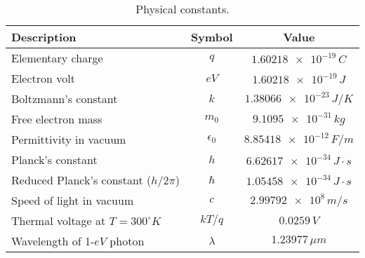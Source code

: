     \begin{table}[H]
    \centering
    \setlength{\tabcolsep}{20pt}
    \renewcommand{\arraystretch}{1.5}
    \begin{tabular}{|l|c|c|}
        \hline
        \textbf{Description}  &  \textbf{Symbol} & \textbf{Value}\\
        \hline
        Elementary charge & $q$ & $\num{1.60218e-19}\,C$\\
        \hline
        Electron volt & $eV$ & $\num{1.60218e-19}\,J$\\
        \hline
        Boltzmann's constant & $k$ & $\num{1.38066e-23}\,J/K$\\
        \hline
        Free electron mass & $m_0$ & $\num{9.1095e-31}\,kg$\\
        \hline
        Permittivity in vacuum & $\epsilon_0$ & $\num{8.85418e-12}\,F/m$\\
        \hline
        Planck's constant & $h$ & $\num{6.62617e-34}\,J \cdot s$\\
        \hline
        Reduced Planck's constant ($h/2\pi$) & $\hbar$ & $\num{1.05458e-34}\,J \cdot s$\\
        \hline
        Speed of light in vacuum & $c$ & $\num{2.99792e8}\,m/s$\\
        \hline
        Thermal voltage at $T=300^{\circ}K$ & $kT/q$ & $0.0259\,V$\\
        \hline
        Wavelength of 1-$eV$ photon & $\lambda$ & $1.23977\,\mu m$\\
        \hline
    \end{tabular}
    \caption{Physical constants.
    \label{tab:phys_const}} 
    \end{table}
\newpage
